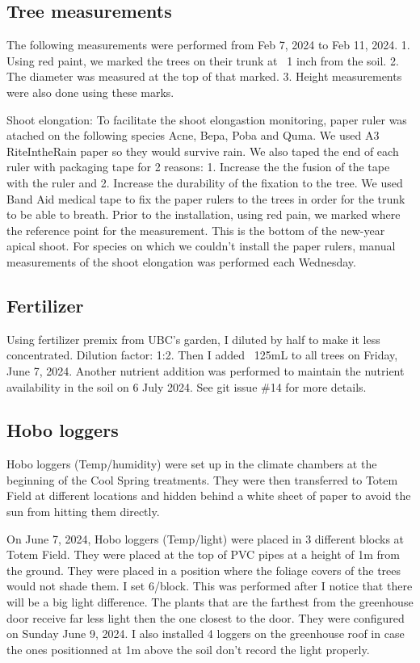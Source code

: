 \documentclass{article}
\begin{document}
\subsection{Tree measurements}
The following measurements were performed from Feb 7, 2024 to Feb 11, 2024.
1. Using red paint, we marked the trees on their trunk at ~1 inch from the soil. 2. The diameter was measured at the top of that marked. 3. Height measurements were also done using these marks. 
\par
Shoot elongation: To facilitate the shoot elongastion monitoring,  paper ruler was atached on the following species Acne, Bepa, Poba and Quma. We used A3 RiteIntheRain paper so they would survive rain. We also taped the end of each ruler with packaging tape for 2 reasons: 1. Increase the the fusion of the tape with the ruler and 2. Increase the durability of the fixation to the tree. We used Band Aid medical tape to fix the paper rulers to the trees in order for the trunk to be able to breath. Prior to the installation, using red pain, we marked where the reference point for the measurement. This is the bottom of the new-year apical shoot. For species on which we couldn't install the paper rulers, manual measurements of the shoot elongation was performed each Wednesday. 
\subsection {Fertilizer}
Using fertilizer premix from UBC's garden, I diluted by half to make it less concentrated. Dilution factor: 1:2. Then I added ~125mL to all trees on Friday, June 7, 2024. Another nutrient addition was performed to maintain the nutrient availability in the soil on 6 July 2024. See git issue \#14 for more details. 

\subsection{Hobo loggers}
Hobo loggers (Temp/humidity) were set up in the climate chambers at the beginning of the Cool Spring treatments. They were then transferred to Totem Field at different locations and hidden behind a white sheet of paper to avoid the sun from hitting them directly. 
\par 
On June 7, 2024, Hobo loggers (Temp/light) were placed in 3 different blocks at Totem Field. They were placed at the top of PVC pipes at a height of 1m from the ground. They were placed in a position where the foliage covers of the trees would not shade them. I set 6/block. This was performed after I notice that there will be a big light difference. The plants that are the farthest from the greenhouse door receive far less light then the one closest to the door. They were configured on Sunday June 9, 2024. I also installed 4 loggers on the greenhouse roof in case the ones positionned at 1m above the soil don't record the light properly. 
\end{document}
